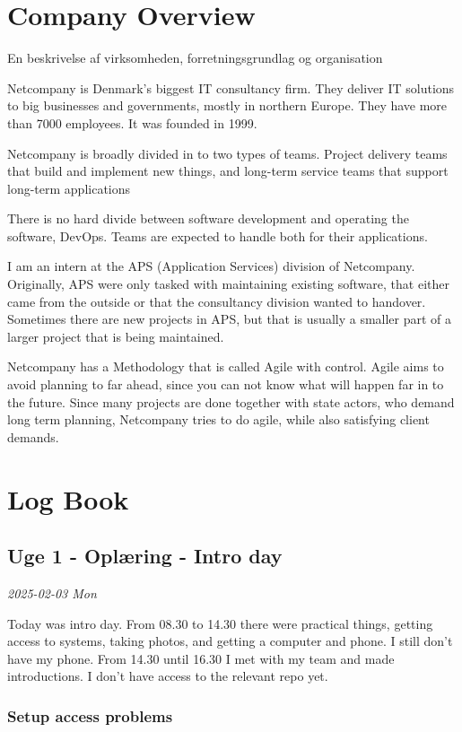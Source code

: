 \documentclass[../main.tex]{subfiles}
\begin{document}
\section{Company Overview}
En beskrivelse af virksomheden, forretningsgrundlag og organisation 

Netcompany is Denmark's biggest IT consultancy firm. They deliver IT solutions to big businesses and governments, mostly in northern Europe.
They have more than 7000 employees. It was founded in 1999. 

Netcompany is broadly divided in to two types of teams. Project delivery teams that build and implement new things, and long-term service teams that support long-term applications

There is no hard divide between software development and operating the software, DevOps. Teams are expected to handle both for their applications. 

I am an intern at the APS (Application Services) division of Netcompany.
Originally, APS were only tasked with maintaining existing software, that either came from the outside or that the consultancy division wanted to handover.
Sometimes there are new projects in APS, but that is usually a smaller part of a larger project that is being maintained.  

Netcompany has a Methodology that is called Agile with control. Agile aims to avoid planning to far ahead, since you can not know what will happen far in to the future.
Since many projects are done together with state actors, who demand long term planning, Netcompany tries to do agile, while also satisfying client demands. 
\section{Log Book}
\subsection{Uge 1 - Oplæring - \textbf{Intro day}}

\textit{2025-02-03 Mon}

Today was intro day. From 08.30 to 14.30 there were practical things, getting access to systems, taking photos, and getting a computer and phone. I still don't have my phone. From 14.30 until 16.30 I met with my team and made introductions. I don't have access to the relevant repo yet.

\subsubsection{\textbf{Setup access problems}}
\end{document}
